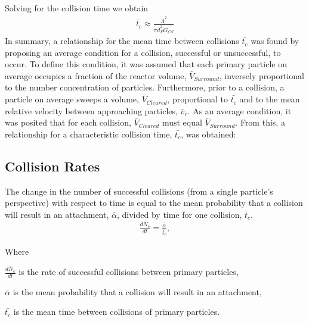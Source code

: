 \documentclass[letterpaper,10pt,english]{sphinxmanual}
\begin{document}
Solving for the collision time we obtain
\begin{equation}\label{equation:Flocculation/Floc_Model:tc}
\begin{split}\bar t_c \approx \frac{\bar \Lambda^2}{\pi \bar d_P^2 \bar G_{CS}}\end{split}
\end{equation}
In summary, a relationship for the mean time between collisions \(\bar{t_{c}}\) was found by proposing an average condition for a collision, successful or unsuccessful, to occur. To define this condition, it was assumed that each primary particle on average occupies a fraction of the reactor volume, \(\bar{V}_{Surround}\), inversely proportional to the number concentration of particles. Furthermore, prior to a collision, a particle on average sweeps a volume, \(\bar{V}_{Cleared}\), proportional to \(\bar{t_c}\) and to the mean relative velocity between approaching particles, \(\bar{v}_r\). As an average condition, it was posited that for each collision, \(\bar{V}_{Cleared}\) must equal \(\bar{V}_{Surround}\). From this, a relationship for a characteristic collision time, \(\bar{t_c}\), was obtained:


\subsection{Collision Rates}
\label{\detokenize{Flocculation/Floc_Model:collision-rates}}\label{\detokenize{Flocculation/Floc_Model:heading-collision-rates}}
The change in the number of successful collisions (from a single particle’s perspective) with respect to time is equal to the mean probability that a collision will result in an attachment, \(\bar{\alpha}\), divided by time for one collision, \(\bar t_c\).
\begin{equation}\label{equation:Flocculation/Floc_Model:dNc}
\begin{split}      \frac{dN_c}{dt}=\frac{\bar{\alpha}}{\bar{t_{c}}},\end{split}
\end{equation}
\begin{DUlineblock}{0em}
\item[] Where
\item[] \(\frac{dN_c}{dt}\) is the rate of successful collisions between primary particles,
\item[] \(\bar{\alpha}\) is the mean probability that a collision will result in an attachment,
\item[] \(\bar{t_{c}}\) is the mean time between collisions of primary particles.
\end{DUlineblock}
\end{document}
